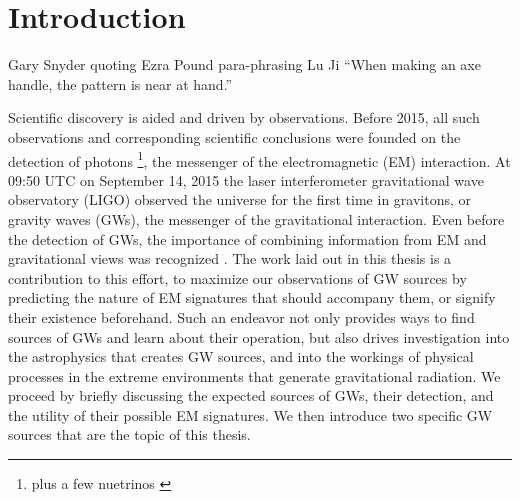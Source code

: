 \chapter[Introduction]{Introduction} \label{ch:intro}
%
%
%
%
%
%
%
\vspace{-16pt} \begin{chapquote}{Gary Snyder quoting Ezra Pound para-phrasing Lu Ji} \singlespacing ``When making an axe handle, the pattern is near at hand.'' 
 \end{chapquote} \vspace{-8pt}
\noindent\makebox[\linewidth]{\rule{0.5\textwidth}{0.5pt}} \vspace{1pt}

Scientific discovery is aided and driven by observations. Before 2015, all
such observations and corresponding scientific conclusions were founded on the
detection of photons \footnote{plus a few nuetrinos \citep{}}, the messenger
of the electromagnetic (EM) interaction. At 09:50 UTC on September 14, 2015
the laser interferometer gravitational wave observatory (LIGO) observed the
universe for the first time in gravitons, or gravity waves (GWs), the
messenger of the gravitational interaction. Even before the detection of GWs,
the importance of combining information from EM and gravitational views was
recognized \citep[\textit{See e.g.}][for some early discussions]{first EM
mentions}. The work laid out in this thesis is a contribution to this effort,
to maximize our observations of GW sources by predicting the nature of EM
signatures that should accompany them, or signify their existence beforehand.
Such an endeavor not only provides ways to find sources of GWs and learn about
their operation, but also drives investigation into the astrophysics that
creates GW sources, and into the workings of physical processes in the extreme
environments that generate gravitational radiation. We proceed by briefly
discussing the expected sources of GWs, their detection, and the utility of
their possible EM signatures. We then introduce two specific GW sources that
are the topic of this thesis.



